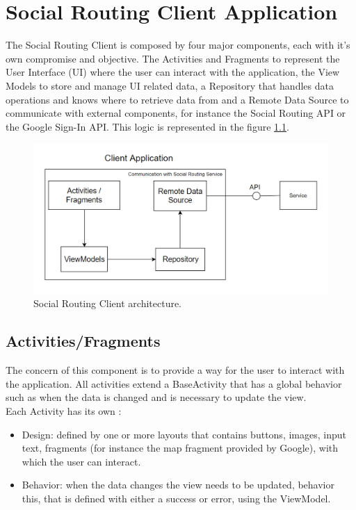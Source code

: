 \chapter{Social Routing Client Application}
The Social Routing Client is composed by four major components, each with it's own compromise and objective.
The Activities\cite{activities} and Fragments\cite{fragments} to represent the User Interface (UI) where the user can interact with
the application, the View Models\cite{viewmodel} to store
and manage UI related data, a Repository that handles data operations and knows where to retrieve data from and a 
Remote Data Source to communicate with external components, for instance the Social Routing API or the Google Sign-In API\cite{googlesignindocs}. 
This logic is represented in the figure \ref{fig:clientarchitecture}.

\begin{figure}[h]            
        \includegraphics[width=\textwidth]{images/project-structure/social-routing-client-application-structure.PNG}
        \caption{Social Routing Client architecture.}
        \label{fig:clientarchitecture}
\end{figure}
\newpage
\section*{Activities/Fragments}
The concern of this component is to provide a way for the user to interact with the application.
All activities extend a BaseActivity that has a global behavior such as when the data is changed and is necessary to update the view.\\

Each Activity has its own :
\begin{itemize}
        \item Design: defined by one or more layouts that contains buttons, images, input text, fragments (for instance the map fragment provided by Google), with which the user can interact.
        \item Behavior: when the data changes the view needs to be updated, behavior this, that is defined with either a success or error, using the ViewModel.
\end{itemize}
 
